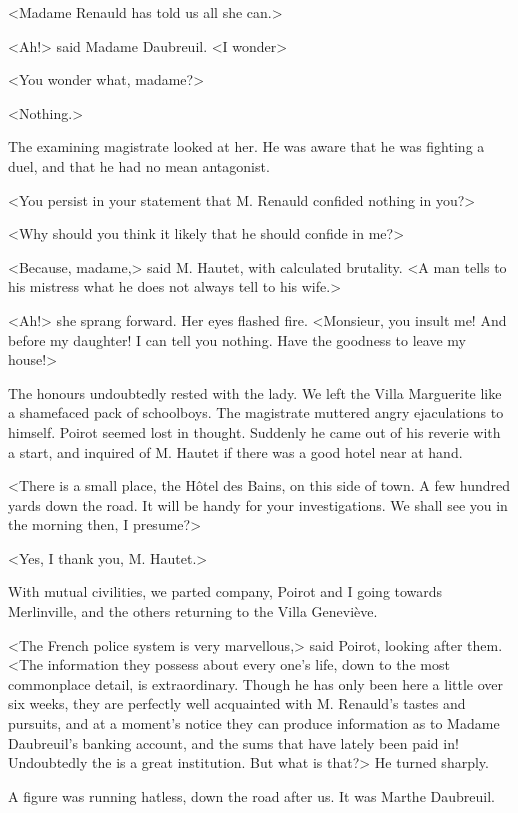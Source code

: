  <Madame Renauld has told us all she can.> 

 <Ah!> said Madame Daubreuil. <I wonder\longdash> 

 <You wonder what, madame?> 

 <Nothing.> 

 The examining magistrate looked at her. He was aware that he was fighting a duel, and that he had no mean antagonist. 

 <You persist in your statement that M. Renauld confided nothing in you?> 

 <Why should you think it likely that he should confide in me?> 

 <Because, madame,> said M. Hautet, with calculated brutality. <A man tells to his mistress what he does not always tell to his wife.> 

 <Ah!> she sprang forward. Her eyes flashed fire. <Monsieur, you insult me! And before my daughter! I can tell you nothing. Have the goodness to leave my house!> 

 The honours undoubtedly rested with the lady. We left the Villa Marguerite like a shamefaced pack of schoolboys. The magistrate muttered angry ejaculations to himself. Poirot seemed lost in thought. Suddenly he came out of his reverie with a start, and inquired of M. Hautet if there was a good hotel near at hand. 

 <There is a small place, the Hôtel des Bains, on this side of town. A few hundred yards down the road. It will be handy for your investigations. We shall see you in the morning then, I presume?> 


 <Yes, I thank you, M. Hautet.> 

 With mutual civilities, we parted company, Poirot and I going towards Merlinville, and the others returning to the Villa Geneviève. 

 <The French police system is very marvellous,> said Poirot, looking after them. <The information they possess about every one's life, down to the most commonplace detail, is extraordinary. Though he has only been here a little over six weeks, they are perfectly well acquainted with M. Renauld's tastes and pursuits, and at a moment's notice they can produce information as to Madame Daubreuil's banking account, and the sums that have lately been paid in! Undoubtedly the  is a great institution. But what is that?> He turned sharply. 

 A figure was running hatless, down the road after us. It was Marthe Daubreuil. 

